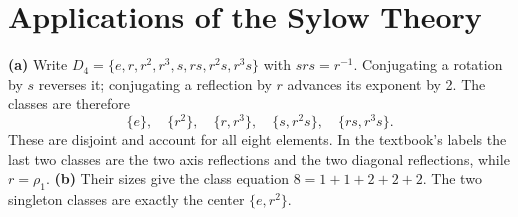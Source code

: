 \section{Applications of the Sylow Theory}

\textbf{(a)} Write $D_4=\{e,r,r^2,r^3,s,rs,r^2s,r^3s\}$ with $srs=r^{-1}$.
Conjugating a rotation by $s$ reverses it; conjugating a reflection by $r$ advances its exponent by 2. The classes are therefore
\[
\{e\},\quad\{r^2\},\quad\{r,r^3\},\quad
\{s,r^2s\},\quad\{rs,r^3s\}.
\]
These are disjoint and account for all eight elements. In the textbook's labels the last two classes are the two axis reflections and the two diagonal reflections, while $r=\rho_1$.
\textbf{(b)} Their sizes give the class equation $8=1+1+2+2+2$. The two singleton classes are exactly the center $\{e,r^2\}$.

